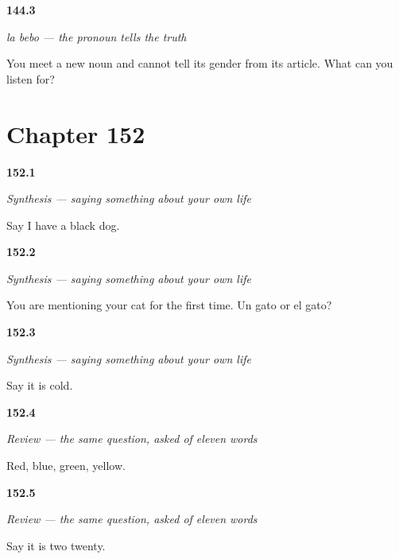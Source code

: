 \noindent\begin{minipage}[t]{\linewidth}
\raggedright
\hypertarget{review-ES-C55-la-bebo-test}{\textbf{144.3}} \emph{la bebo — the pronoun tells the truth}\par
\small You meet a new noun and cannot tell its gender from its article. What can you listen for?
\end{minipage}\par\medskip

\section*{Chapter 152}

\noindent\begin{minipage}[t]{\linewidth}
\raggedright
\hypertarget{review-ES-C40-sintesis-describir-have}{\textbf{152.1}} \emph{Synthesis — saying something about your own life}\par
\small Say I have a black dog.
\end{minipage}\par\medskip

\noindent\begin{minipage}[t]{\linewidth}
\raggedright
\hypertarget{review-ES-C40-sintesis-describir-article}{\textbf{152.2}} \emph{Synthesis — saying something about your own life}\par
\small You are mentioning your cat for the first time. Un gato or el gato?
\end{minipage}\par\medskip

\noindent\begin{minipage}[t]{\linewidth}
\raggedright
\hypertarget{review-ES-C40-sintesis-describir-weather}{\textbf{152.3}} \emph{Synthesis — saying something about your own life}\par
\small Say it is cold.
\end{minipage}\par\medskip

\noindent\begin{minipage}[t]{\linewidth}
\raggedright
\hypertarget{review-ES-C40-repaso-palabras-con-historia-colores}{\textbf{152.4}} \emph{Review — the same question, asked of eleven words}\par
\small Red, blue, green, yellow.
\end{minipage}\par\medskip

\noindent\begin{minipage}[t]{\linewidth}
\raggedright
\hypertarget{review-ES-C40-repaso-palabras-con-historia-hora}{\textbf{152.5}} \emph{Review — the same question, asked of eleven words}\par
\small Say it is two twenty.
\end{minipage}\par\medskip


